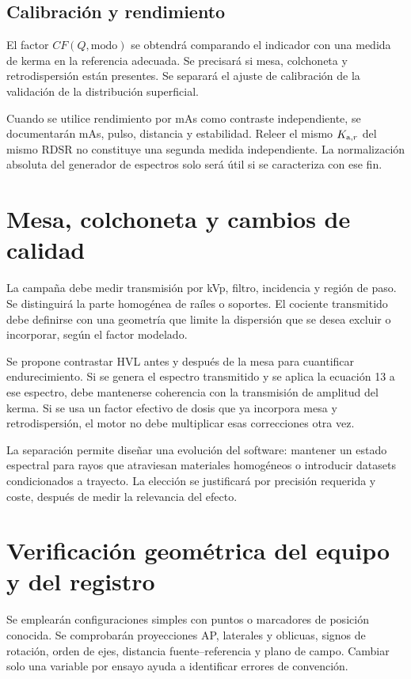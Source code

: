 \subsection{Calibración y rendimiento}
El factor $CF(Q,\mathrm{modo})$ se obtendrá comparando el indicador con una medida de kerma en la referencia adecuada. Se precisará si mesa, colchoneta y retrodispersión están presentes. Se separará el ajuste de calibración de la validación de la distribución superficial.

Cuando se utilice rendimiento por mAs como contraste independiente, se documentarán mAs, pulso, distancia y estabilidad. Releer el mismo $K_{\mathrm{a},r}$ del mismo RDSR no constituye una segunda medida independiente. La normalización absoluta del generador de espectros solo será útil si se caracteriza con ese fin.

\section{Mesa, colchoneta y cambios de calidad}
La campaña debe medir transmisión por kVp, filtro, incidencia y región de paso. Se distinguirá la parte homogénea de raíles o soportes. El cociente transmitido debe definirse con una geometría que limite la dispersión que se desea excluir o incorporar, según el factor modelado.

Se propone contrastar HVL antes y después de la mesa para cuantificar endurecimiento. Si se genera el espectro transmitido y se aplica la ecuación 13 a ese espectro, debe mantenerse coherencia con la transmisión de amplitud del kerma. Si se usa un factor efectivo de dosis que ya incorpora mesa y retrodispersión, el motor no debe multiplicar esas correcciones otra vez.

La separación permite diseñar una evolución del software: mantener un estado espectral para rayos que atraviesan materiales homogéneos o introducir datasets condicionados a trayecto. La elección se justificará por precisión requerida y coste, después de medir la relevancia del efecto.

\section{Verificación geométrica del equipo y del registro}
Se emplearán configuraciones simples con puntos o marcadores de posición conocida. Se comprobarán proyecciones AP, laterales y oblicuas, signos de rotación, orden de ejes, distancia fuente--referencia y plano de campo. Cambiar solo una variable por ensayo ayuda a identificar errores de convención.


